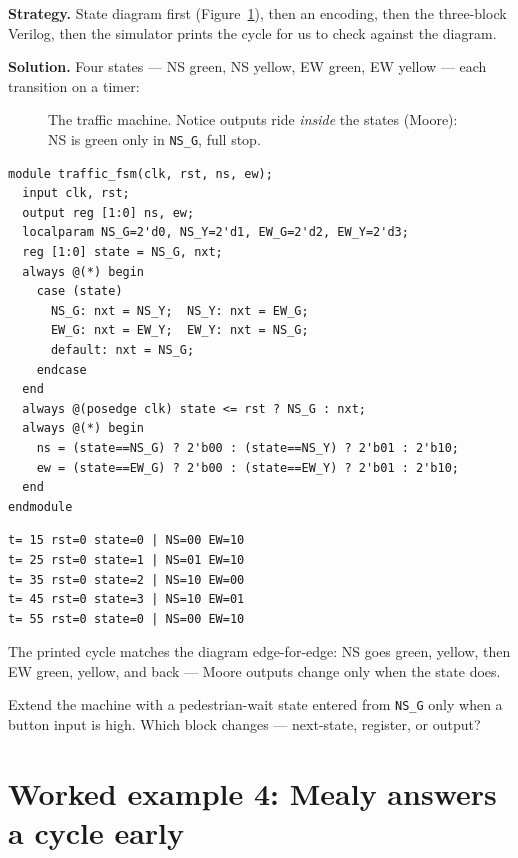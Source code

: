 \textbf{Strategy.} State diagram first (Figure~\ref{fig:fsm}), then an
encoding, then the three-block Verilog, then the simulator prints the
cycle for us to check against the diagram.

\textbf{Solution.} Four states — NS green, NS yellow, EW green, EW
yellow — each transition on a timer:

\begin{figure}[htbp]
\centering

\caption{The traffic machine. Notice outputs ride \emph{inside} the
states (Moore): NS is green only in \texttt{NS\_G}, full stop.}
\label{fig:fsm}
\end{figure}

\begin{lstlisting}[caption={\ttfamily code/ch10\_traffic\_fsm.v ---
always-three-block style.},label={lst:fsm},abovecaptionskip=0pt]
module traffic_fsm(clk, rst, ns, ew);
  input clk, rst;
  output reg [1:0] ns, ew;
  localparam NS_G=2'd0, NS_Y=2'd1, EW_G=2'd2, EW_Y=2'd3;
  reg [1:0] state = NS_G, nxt;
  always @(*) begin
    case (state)
      NS_G: nxt = NS_Y;  NS_Y: nxt = EW_G;
      EW_G: nxt = EW_Y;  EW_Y: nxt = NS_G;
      default: nxt = NS_G;
    endcase
  end
  always @(posedge clk) state <= rst ? NS_G : nxt;
  always @(*) begin
    ns = (state==NS_G) ? 2'b00 : (state==NS_Y) ? 2'b01 : 2'b10;
    ew = (state==EW_G) ? 2'b00 : (state==EW_Y) ? 2'b01 : 2'b10;
  end
endmodule
\end{lstlisting}

\begin{lstlisting}[caption={The real full-cycle trace --- GRN
(\texttt{00})$\to$YEL (\texttt{01}) around the loop, EW red
(\texttt{10}) throughout the NS phase.},abovecaptionskip=0pt]
t= 15 rst=0 state=0 | NS=00 EW=10
t= 25 rst=0 state=1 | NS=01 EW=10
t= 35 rst=0 state=2 | NS=10 EW=00
t= 45 rst=0 state=3 | NS=10 EW=01
t= 55 rst=0 state=0 | NS=00 EW=10
\end{lstlisting}

The printed cycle matches the diagram edge-for-edge: NS goes green,
yellow, then EW green, yellow, and back — Moore outputs change only
when the state does.

\begin{exercise}[medium]
Extend the machine with a pedestrian-wait state entered from
\texttt{NS\_G} only when a button input is high. Which block changes —
next-state, register, or output?
\end{exercise}


\section{Worked example 4: Mealy answers a cycle early}
\label{sec:we-mealy}


